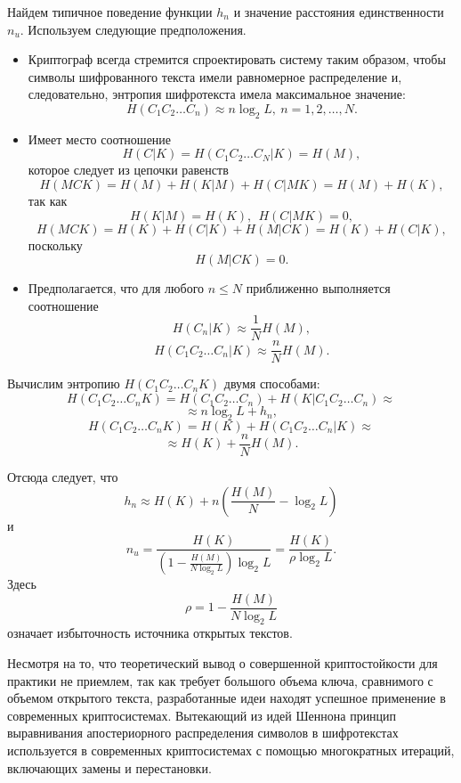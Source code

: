 Найдем типичное поведение функции $h_n$ и значение расстояния единственности $n_u$. Используем следующие предположения.
\begin{itemize}
    \item Криптограф всегда стремится спроектировать систему таким образом, чтобы символы шифрованного текста имели равномерное распределение и, следовательно, энтропия шифротекста имела максимальное значение:
            \[ H(C_1 C_2 \dots C_n) \approx n \log_2 L, ~ n = 1, 2, \dots, N. \]
    \item Имеет место соотношение
            \[ H(C | K) = H(C_1 C_2 \dots C_N | K)  =  H(M), \]
        которое следует из цепочки равенств
            \[ H(MCK) = H(M) + H(K | M) + H(C | MK) = H(M) + H(K), \]
        так как
            \[ H(K | M) = H(K), ~~ H(C | MK) = 0, \]
            \[H(MCK) = H(K) + H(C | K) + H(M | CK) = H(K) + H(C | K), \]
        поскольку
            \[ H(M | CK) = 0. \]
    \item Предполагается, что для любого $n \le N$ приближенно выполняется соотношение
        \[ H(C_n | K) \approx \frac{1}{N} H(M), \]
        \[ H(C_1 C_2\dots C_n | K) \approx \frac{n}{N} H(M). \]
\end{itemize}

Вычислим энтропию $H(C_1 C_2 \dots C_n K)$ двумя способами:
    \[ H(C_1 C_2 \dots C_n K) = H(C_1 C_2 \dots C_n) + H(K | C_1 C_2 \dots C_n) \approx \]
        \[ \approx n \log_2 L + h_n, \]
    \[H(C_1 C_2 \dots C_n K) = H(K) + H(C_1 C_2 \dots C_n | K) \approx \]
        \[ \approx H(K) + \frac{n}{N} H(M). \]

Отсюда следует, что
    \[ h_n \approx H(K) + n \left( \frac{H(M)}{N} - \log_2 L \right) \]
и
    \[ n_u = \frac{H(K)}{ \left( 1 - \frac{H(M)}{N \log_2 L} \right) \log_2 L} = \frac{H(K)}{\rho \log_2 L}. \]
Здесь
    \[ \rho = 1 - \frac{H(M)}{N \log_2 L} \]
означает избыточность источника открытых текстов.


Несмотря на то, что теоретический вывод о совершенной криптостойкости для практики не приемлем, так как требует большого объема ключа, сравнимого с объемом открытого текста, разработанные идеи находят успешное применение в современных криптосистемах. Вытекающий из идей Шеннона принцип выравнивания апостериорного распределения символов в шифротекстах используется в современных криптосистемах с помощью многократных итераций, включающих замены и перестановки.
